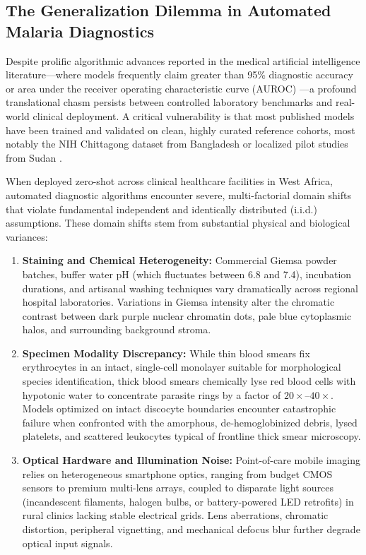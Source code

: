 \documentclass[a4paper,11pt]{article}
\begin{document}
\subsection{The Generalization Dilemma in Automated Malaria Diagnostics}
Despite prolific algorithmic advances reported in the medical artificial intelligence literature---where models frequently claim greater than 95\% diagnostic accuracy or area under the receiver operating characteristic curve (AUROC) \citep{rajaraman2018,liang2020,yang2020}---a profound translational chasm persists between controlled laboratory benchmarks and real-world clinical deployment. A critical vulnerability is that most published models have been trained and validated on clean, highly curated reference cohorts, most notably the NIH Chittagong dataset from Bangladesh \citep{rajaraman2018} or localized pilot studies from Sudan \citep{liang2020}.

When deployed zero-shot across clinical healthcare facilities in West Africa, automated diagnostic algorithms encounter severe, multi-factorial domain shifts that violate fundamental independent and identically distributed (i.i.d.) assumptions. These domain shifts stem from substantial physical and biological variances:
\begin{enumerate}
    \item \textbf{Staining and Chemical Heterogeneity:} Commercial Giemsa powder batches, buffer water pH (which fluctuates between 6.8 and 7.4), incubation durations, and artisanal washing techniques vary dramatically across regional hospital laboratories. Variations in Giemsa intensity alter the chromatic contrast between dark purple nuclear chromatin dots, pale blue cytoplasmic halos, and surrounding background stroma.
    \item \textbf{Specimen Modality Discrepancy:} While thin blood smears fix erythrocytes in an intact, single-cell monolayer suitable for morphological species identification, thick blood smears chemically lyse red blood cells with hypotonic water to concentrate parasite rings by a factor of $20\times\text{--}40\times$. Models optimized on intact discocyte boundaries encounter catastrophic failure when confronted with the amorphous, de-hemoglobinized debris, lysed platelets, and scattered leukocytes typical of frontline thick smear microscopy.
    \item \textbf{Optical Hardware and Illumination Noise:} Point-of-care mobile imaging relies on heterogeneous smartphone optics, ranging from budget CMOS sensors to premium multi-lens arrays, coupled to disparate light sources (incandescent filaments, halogen bulbs, or battery-powered LED retrofits) in rural clinics lacking stable electrical grids. Lens aberrations, chromatic distortion, peripheral vignetting, and mechanical defocus blur further degrade optical input signals.
\end{enumerate}
\end{document}
